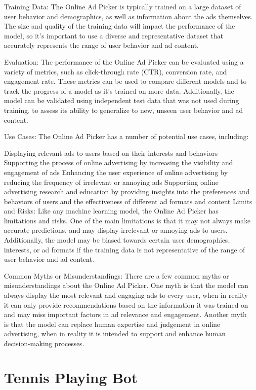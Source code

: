 Training Data:
The Online Ad Picker is typically trained on a large dataset of user behavior and demographics, as well as information about the ads themselves. The size and quality of the training data will impact the performance of the model, so it's important to use a diverse and representative dataset that accurately represents the range of user behavior and ad content.

Evaluation:
The performance of the Online Ad Picker can be evaluated using a variety of metrics, such as click-through rate (CTR), conversion rate, and engagement rate. These metrics can be used to compare different models and to track the progress of a model as it's trained on more data. Additionally, the model can be validated using independent test data that was not used during training, to assess its ability to generalize to new, unseen user behavior and ad content.

Use Cases:
The Online Ad Picker has a number of potential use cases, including:

Displaying relevant ads to users based on their interests and behaviors
Supporting the process of online advertising by increasing the visibility and engagement of ads
Enhancing the user experience of online advertising by reducing the frequency of irrelevant or annoying ads
Supporting online advertising research and education by providing insights into the preferences and behaviors of users and the effectiveness of different ad formats and content
Limits and Risks:
Like any machine learning model, the Online Ad Picker has limitations and risks. One of the main limitations is that it may not always make accurate predictions, and may display irrelevant or annoying ads to users. Additionally, the model may be biased towards certain user demographics, interests, or ad formats if the training data is not representative of the range of user behavior and ad content.

Common Myths or Misunderstandings:
There are a few common myths or misunderstandings about the Online Ad Picker. One myth is that the model can always display the most relevant and engaging ads to every user, when in reality it can only provide recommendations based on the information it was trained on and may miss important factors in ad relevance and engagement. Another myth is that the model can replace human expertise and judgement in online advertising, when in reality it is intended to support and enhance human decision-making processes.

\section{Tennis Playing Bot}

